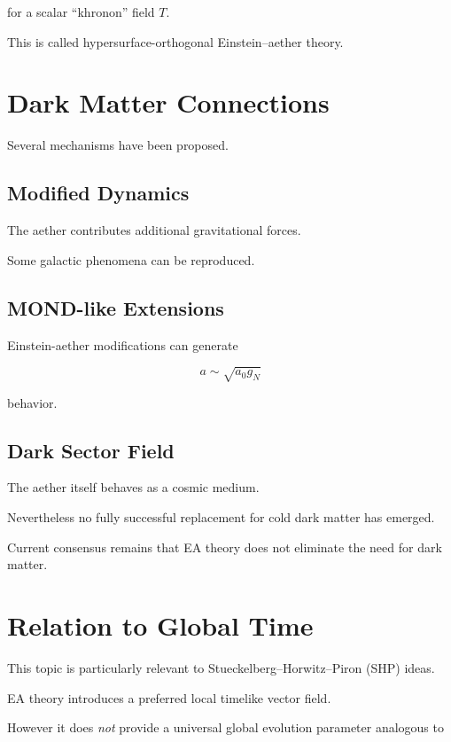 for a scalar ``khronon'' field $T$.

This is called hypersurface-orthogonal Einstein--aether theory.

\section{Dark Matter Connections}

Several mechanisms have been proposed.

\subsection{Modified Dynamics}

The aether contributes additional gravitational forces.

Some galactic phenomena can be reproduced.

\subsection{MOND-like Extensions}

Einstein-aether modifications can generate

\begin{equation}
a \sim \sqrt{a_0 g_N}
\end{equation}

behavior.

\subsection{Dark Sector Field}

The aether itself behaves as a cosmic medium.

Nevertheless no fully successful replacement for
cold dark matter has emerged.

Current consensus remains that EA theory does not eliminate
the need for dark matter.

\section{Relation to Global Time}

This topic is particularly relevant to
Stueckelberg--Horwitz--Piron (SHP) ideas.

EA theory introduces a preferred local timelike vector field.

However it does \emph{not} provide a universal global evolution
parameter analogous to

